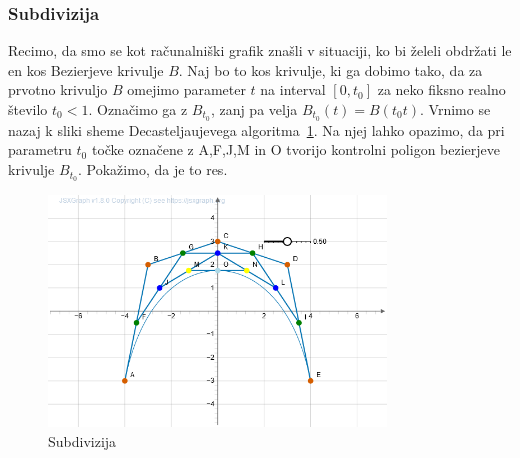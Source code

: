 \documentclass[isrm2, tisk]{fmfdelo}
\begin{document}
    \subsubsection{Subdivizija}
    Recimo, da smo se kot računalniški grafik znašli v situaciji, ko bi želeli obdržati le en kos Bezierjeve krivulje $B$.
    Naj bo to kos krivulje, ki ga dobimo tako, da za prvotno krivuljo $B$ omejimo parameter $t$ na interval $[0,t_0]$ za neko fiksno realno število $t_0<1$.
    Označimo ga z $B_{t_0}$, zanj pa velja $B_{t_0}(t)=B(t_{0}t)$.
    Vrnimo se nazaj k sliki sheme Decasteljaujevega algoritma~\ref{fig:subdivizija}.
    Na njej lahko opazimo, da pri parametru $t_0$ točke označene z A,F,J,M in O tvorijo kontrolni poligon bezierjeve krivulje $B_{t_0}$.
    Pokažimo, da je to res.

    \begin{figure}[h!]
        \centering
        \includegraphics[width=0.8\textwidth]{images/subidivizja.png}
        \caption{Subdivizija}
        \label{fig:subdivizija}
    \end{figure}
\end{document}
